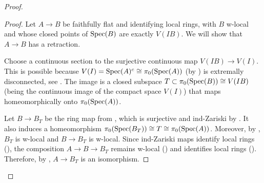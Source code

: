 \begin{proof}
\begin{proof}
  Let $A \to B$ be faithfully flat and identifying local rings, with \(B\) w-local and whose closed points of \(\operatorname{Spec} (B)\) are exactly \(V(IB)\). We will show that $A \to B$ has a retraction.


  Choose a continuous section to the surjective continuous map $V(IB) \to V(I)$. This is possible because $V(I) = \operatorname{Spec}(A)^c \cong \pi_0(\operatorname{Spec}(A))$ (by ) is extremally disconnected, see . The image is a closed subspace $T \subset \pi_0(\operatorname{Spec}(B)) \cong V(IB)$ (being the continuous image of the compact space $V(I)$) that maps homeomorphically onto $\pi_0(\operatorname{Spec}(A))$. 
  
  Let $B \to B_T$ be the ring map from , which is surjective and ind-Zariski by . It also induces a homeomorphism $\pi_0(\operatorname{Spec}(B_T)) \cong T \cong \pi_0(\operatorname{Spec}(A))$.
  Moreover, by , $B_T$ is w-local and $B \to B_T$ is w-local. Since ind-Zariski maps identify local rings (), the composition $A \to B \to B_T$ remains w-local () and identifies local rings (). Therefore, by , $A \to B_T$ is an isomorphism.
\end{proof}


\end{proof}
